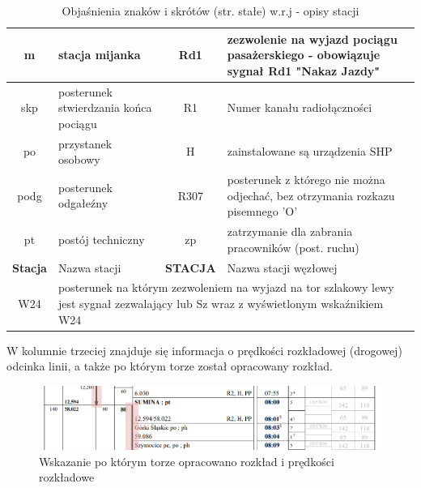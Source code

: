 \begin{table}
	\begin{tabular}{|c|m{4cm}|c|m{4cm}|}
		\hline 
		m & stacja mijanka & Rd1 & zezwolenie na wyjazd pociągu pasażerskiego - obowiązuje sygnał Rd1 "Nakaz Jazdy" \\ 
		\hline
		skp & posterunek stwierdzania końca pociągu & R1& Numer kanału radiołączności\\ 
		\hline
		po	& przystanek osobowy & H & zainstalowane są urządzenia SHP\\ 
		\hline
		podg	& posterunek odgałeźny &  R307	& posterunek z którego nie można odjechać, bez otrzymania rozkazu pisemnego 'O'\\ 
		\hline
		pt	& postój techniczny & zp & zatrzymanie dla zabrania pracowników (post. ruchu)\\ 
		\hline
		\textbf{Stacja}	& Nazwa stacji & \textbf{STACJA} & Nazwa stacji węzłowej \\ 
		\hline
		W24	& \multicolumn{3}{m{9cm}|}{posterunek na którym zezwoleniem na wyjazd na tor szlakowy lewy jest sygnał zezwalający lub Sz wraz z wyświetlonym wskaźnikiem W24} \\
		\hline
	\end{tabular} 
	\caption{Objaśnienia znaków i skrótów (str. stałe) w.r.j - opisy stacji}
\end{table}
W kolumnie trzeciej znajduje się informacja o prędkości rozkładowej (drogowej) odcinka linii, a także po którym torze został opracowany rozkład.
\begin{figure}
	\includegraphics[width=12cm]{skryptkierownik-img/tor-lewy.png}
	\caption{Wskazanie po którym torze opracowano rozkład i prędkości rozkładowe}
\end{figure}

